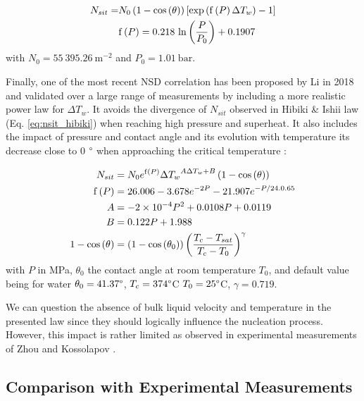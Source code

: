 \begin{align}
N_{sit} =& N_{0}\left( 1-\mathrm{cos}\left( \theta \right) \right)\left[ \mathrm{exp}\left( \mathrm{f}\left( P \right) \Delta T_{w}  \right) -1  \right]
\label{eq:nsit_zhou}\\
&\mathrm{f}\left( P \right) = 0.218~\mathrm{ln}\left( \dfrac{P}{P_{0}} \right)+0.1907
\end{align}
with $N_{0}=55~395.26\ \mathrm{m}^{-2}$ and $P_{0}=1.01\ \mathrm{bar}$.

\npar

Finally, one of the most recent NSD correlation has been proposed by Li \etal in 2018 \cite{li_development_2018} and validated over a large range of measurements by including a more realistic power law for $\Delta T_{w}$. It avoids the divergence of $N_{sit}$ observed in Hibiki \& Ishii law (Eq. \ref{eq:nsit_hibiki}) when reaching high pressure and superheat. It also includes the impact of pressure and contact angle and its evolution with temperature \eg its decrease close to 0 $\degree$ when approaching the critical temperature \cite{song_temperature_2021}:


\begin{align}
N_{sit} &= N_{0}e^{\mathrm{f}\parth{P}} {\Delta T_{w}}^{A\Delta T_{w} + B} \parth{1- \cos{\theta}}
\label{eq:nsit_li}\\
%
\mathrm{f}\parth{P} &= 26.006 - 3.678 e^{-2P} - 21.907e^{-P / 24.0.65}\\
%
A &= -2\times 10^{-4} P^{2} + 0.0108P + 0.0119\\
%
B &= 0.122P +1.988\\
%
1-\cos{\theta} &= \parth{1-\cos{\theta_{0}}}\parth{\frac{T_{c}-T_{sat}}{T_{c}-T_{0}}}^{\gamma}
\end{align}
with $P$ in MPa, $\theta_{0}$ the contact angle at room temperature $T_{0}$, and default value being for water $\theta_{0}=41.37 \degree$, $T_{c}=374 \degree$C $T_{0}=25\degree$C, $\gamma = 0.719$.

\npar

\begin{remark*}{}
We can question the absence of bulk liquid velocity and temperature in the presented law since they should logically influence the nucleation process. However, this impact is rather limited as observed in experimental measurements of Zhou \etal \cite{zhou_experimental_2020} and Kossolapov \cite{kossolapov_experimental_2021}.
\end{remark*}

\subsection{Comparison with Experimental Measurements}

